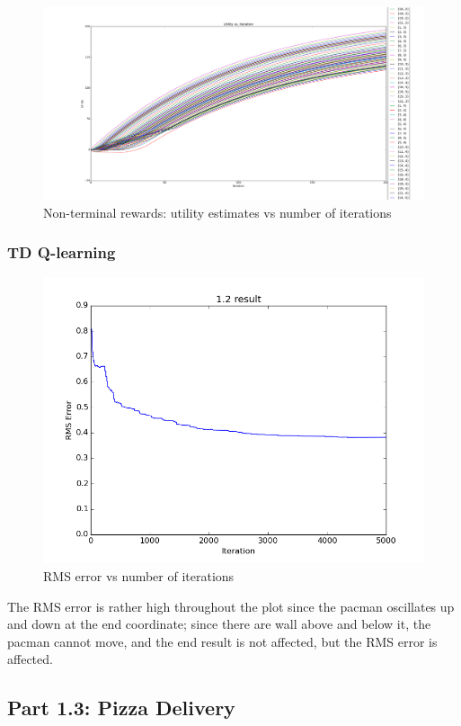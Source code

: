 \begin{figure}[H]
  \centering
  \includegraphics[width=\linewidth]{graphics/inf_11ec_util_iters.png}
  \caption{Non-terminal rewards: utility estimates vs number of iterations}
\end{figure}

\subsubsection{TD Q-learning}
\begin{figure}[H]
  \centering
  \includegraphics[width=0.5\linewidth]{graphics/rmse_plot_12ec.png}
  \caption{RMS error vs number of iterations}
\end{figure}
The RMS error is rather high throughout the plot since the pacman oscillates up and down at the end coordinate; since there are wall above and below it, the pacman cannot move, and the end result is not affected, but the RMS error is affected.

\subsection{Part 1.3: Pizza Delivery}

